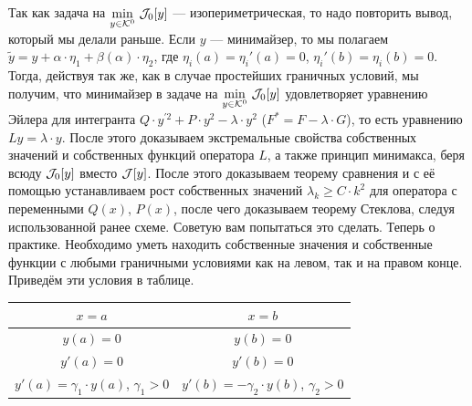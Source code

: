 Так как задача на $\displaystyle\min\limits_{y\in\mathcal{K}^0}\,\mathcal{J}_0[y]$ --- изопериметрическая, то надо повторить вывод, который мы делали раньше. Если $y$ --- минимайзер, то мы полагаем $\tilde{y}=y+\alpha\cdot\eta_1+\beta(\alpha)\cdot\eta_2$, где $\eta_i(a)=\eta_i'(a)=0$, $\eta_i'(b)=\eta_i(b)=0$. Тогда{\mb,} действуя так же, как в случае простейших граничных условий, мы получим, что минимайзер в задаче на $\displaystyle\min\limits_{y\in\mathcal{K}^0}\,\mathcal{J}_0[y]$ удовлетворяет уравнению Эйлера для интегранта $Q\cdot y^{\prime2}+P\cdot y^2-\lambda\cdot y^2$ ($F^{\ast}=F-\lambda\cdot G$), то есть уравнению $Ly=\lambda\cdot y$. После этого доказываем экстремальные свойства собственных значений и собственных функций оператора $L$, а также принцип минимакса, беря всюду $\mathcal{J}_0[y]$ вместо $\mathcal{J}[y]$. После этого доказываем теорему сравнения и с её помощью устанавливаем рост собственных значений $\lambda_k\geqslant C\cdot k^2$ для оператора с переменными $Q(x)$, $P(x)$, после чего доказываем теорему Стеклова, следуя использованной ранее схеме. Советую вам попытаться это сделать. Теперь о практике. Необходимо уметь находить собственные значения и собственные функции с любыми граничными условиями как на левом, так и на правом конце. Приведём эти условия в таблице.
\begin{center}
	\begin{tabular}{|c|c|}
		\hline
		$x=a$ & $x=b$ \\
		\hline
		$y(a)=0$ & $y(b)=0$ \\
		\hline
		$y'(a)=0$ & $y'(b)=0$ \\
		\hline
		$y'(a)=\gamma_1\cdot y(a)$, $\gamma_1>0$ & $y'(b)=-\gamma_2\cdot y(b)$, $\gamma_2>0$ \\
		\hline
	\end{tabular} 
\end{center}